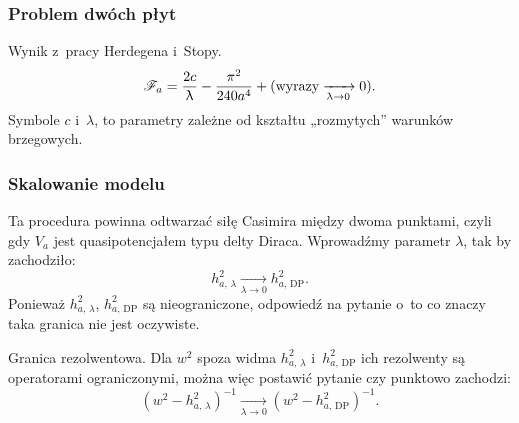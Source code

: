 \documentclass[10pt,t]{beamer}
\begin{document}
\begin{frame}
  \frametitle{Problem dwóch płyt}


  Wynik z~pracy Herdegena i~Stopy.
  \begin{equation}
    \label{eq:Efekt-Casimira-18}
    \mathcal{F}_{ a } =
    \frac{ 2 c }{ \uplambda } - \frac{ \pi^{ 2 } }{ 240 a^{ 4 } }
    + ( \textrm{wyrazy} \xrightarrow[ \uplambda \to 0 ]{} 0 ).
  \end{equation}
  Symbole $c$ i~$\lambda$, to parametry zależne od kształtu „rozmytych” warunków
  brzegowych.

\end{frame}





\begin{frame}
  \frametitle{Skalowanie modelu}


  Ta procedura powinna odtwarzać siłę Casimira między dwoma punktami,
  czyli gdy $V_{ a }$ jest quasipotencjałem typu delty Diraca. Wprowadźmy
  parametr $\lambda$, tak by zachodziło:
  \begin{equation}
    \label{eq:Efekt-Casimira-19}
    h_{ a,\, \lambda }^{ 2 } \xrightarrow[ \lambda \to 0 ]{}
    h_{ a,\, \textrm{DP} }^{ 2 }.
  \end{equation}
  Ponieważ $h_{ a,\, \lambda }^{ 2 }$, $h_{ a,\, \textrm{DP} }^{ 2 }$ są
  nieograniczone, odpowiedź na pytanie o~to co znaczy taka granica
  nie jest oczywiste.

  Granica rezolwentowa. Dla $w^{ 2 }$ spoza widma $h_{ a,\, \lambda }^{ 2 }$
  i~$h_{ a,\, \textrm{DP} }^{ 2 }$ ich rezolwenty są operatorami
  ograniczonymi, można więc postawić pytanie czy punktowo zachodzi:
  \begin{equation}
    \label{eq:Efekt-Casimira-20}
    ( w^{ 2 } - h_{ a,\, \lambda }^{ 2 } )^{ -1 }
    \xrightarrow[ \lambda \to 0 ]{}
    ( w^{ 2 } - h_{ a,\, \textrm{DP} }^{ 2 } )^{ -1 }.
  \end{equation}

\end{frame}
\end{document}
